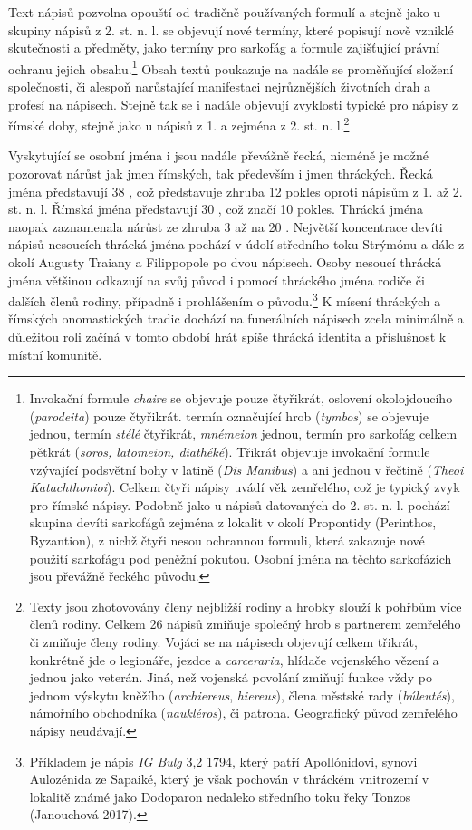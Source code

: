 Text nápisů pozvolna opouští od tradičně používaných formulí a stejně jako u skupiny nápisů z 2. st. n. l. se objevují nové termíny, které popisují nově vzniklé skutečnosti a předměty, jako termíny pro sarkofág a formule zajišťující právní ochranu jejich obsahu.\footnote{Invokační formule {\em chaire} se objevuje pouze čtyřikrát, oslovení okolojdoucího ({\em parodeita}) pouze čtyřikrát. termín označující hrob ({\em tymbos}) se objevuje jednou, termín {\em stélé} čtyřikrát, {\em mnémeion} jednou, termín pro sarkofág celkem pětkrát ({\em soros, latomeion, diathéké}). Třikrát objevuje invokační formule vzývající podsvětní bohy v latině ({\em Dis Manibus}) a ani jednou v řečtině ({\em Theoi Katachthonioi}). Celkem čtyři nápisy uvádí věk zemřelého, což je typický zvyk pro římské nápisy. Podobně jako u nápisů datovaných do 2. st. n. l. pochází skupina devíti sarkofágů zejména z lokalit v okolí Propontidy (Perinthos, Byzantion), z nichž čtyři nesou ochrannou formuli, která zakazuje nové použití sarkofágu pod peněžní pokutou. Osobní jména na těchto sarkofázích jsou převážně řeckého původu.} Obsah textů poukazuje na nadále se proměňující složení společnosti, či alespoň narůstající manifestaci nejrůznějších životních drah a profesí na nápisech. Stejně tak se i nadále objevují zvyklosti typické pro nápisy z římské doby, stejně jako u nápisů z 1. a zejména z 2. st. n. l.\footnote{Texty jsou zhotovovány členy nejbližší rodiny a hrobky slouží k pohřbům více členů rodiny. Celkem 26 nápisů zmiňuje společný hrob s partnerem zemřelého či zmiňuje členy rodiny. Vojáci se na nápisech objevují celkem třikrát, konkrétně jde o legionáře, jezdce a {\em carceraria}, hlídače vojenského vězení a jednou jako veterán. Jiná, než vojenská povolání zmiňují funkce vždy po jednom výskytu kněžího ({\em archiereus}, {\em hiereus}), člena městské rady ({\em búleutés}), námořního obchodníka ({\em naukléros}), či patrona. Geografický původ zemřelého nápisy neudávají.}

Vyskytující se osobní jména i jsou nadále převážně řecká, nicméně je možné pozorovat nárůst jak jmen římských, tak především i jmen thráckých. Řecká jména představují 38 , což představuje zhruba 12  pokles oproti nápisům z 1. až 2. st. n. l. Římská jména představují 30 , což značí 10  pokles. Thrácká jména naopak zaznamenala nárůst ze zhruba 3  až na 20 . Největší koncentrace devíti nápisů nesoucích thrácká jména pochází v údolí středního toku Strýmónu a dále z okolí Augusty Traiany a Filippopole po dvou nápisech. Osoby nesoucí thrácká jména většinou odkazují na svůj původ i pomocí thráckého jména rodiče či dalších členů rodiny, případně i prohlášením o původu.\footnote{Příkladem je nápis {\em IG Bulg} 3,2 1794, který patří Apollónidovi, synovi Aulozénida ze Sapaiké, který je však pochován v thráckém vnitrozemí v lokalitě známé jako Dodoparon nedaleko středního toku řeky Tonzos (Janouchová 2017).} K mísení thráckých a římských onomastických tradic dochází na funerálních nápisech zcela minimálně a důležitou roli začíná v tomto období hrát spíše thrácká identita a příslušnost k místní komunitě.

